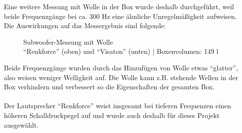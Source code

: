 Eine weitere Messung mit Wolle in der Box wurde deshalb durchgeführt, weil beide Frequenzgänge bei ca. 300 Hz eine ähnliche Unregelmäßigkeit aufweisen.
Die Auswirkungen auf das Messergebnis sind folgende:
\begin{figure} [H]
	\centering
	\quad
	\caption{Subwoofer-Messung mit Wolle\\ \enquote{Renkforce} (oben) und \enquote{Visaton} (unten) | Boxenvolumen: 149 l}
	\label{fig:4.2.3.3}
\end{figure}
Beide Frequenzgänge wurden durch das Hinzufügen von Wolle etwas \enquote{glatter}, also weisen weniger Welligkeit auf.
Die Wolle kann z.B. stehende Wellen in der Box verhindern und verbessert so die Eigenschaften der gesamten Box.\\ \\	%
Der Lautsprecher \enquote{Renkforce} weist insgesamt bei tieferen Frequenzen einen höheren Schalldruckpegel auf und wurde auch deshalb für dieses Projekt ausgewählt.

\newpage
